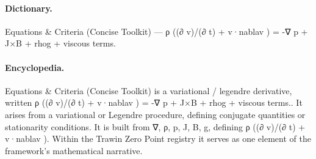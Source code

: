\paragraph{Dictionary.}
Equations \& Criteria (Concise Toolkit) — ρ ((∂ v)/(∂ t) + v·nablav ) = -∇ p + J×B + rhog + viscous terms.

\paragraph{Encyclopedia.}
Equations \& Criteria (Concise Toolkit) is a variational / legendre derivative, written ρ ((∂ v)/(∂ t) + v·nablav ) = -∇ p + J×B + rhog + viscous terms.. It arises from a variational or Legendre procedure, defining conjugate quantities or stationarity conditions. It is built from ∇, ρ, p, J, B, g, defining ρ ((∂ v)/(∂ t) + v·nablav ). Within the Trawin Zero Point registry it serves as one element of the framework's mathematical narrative.
